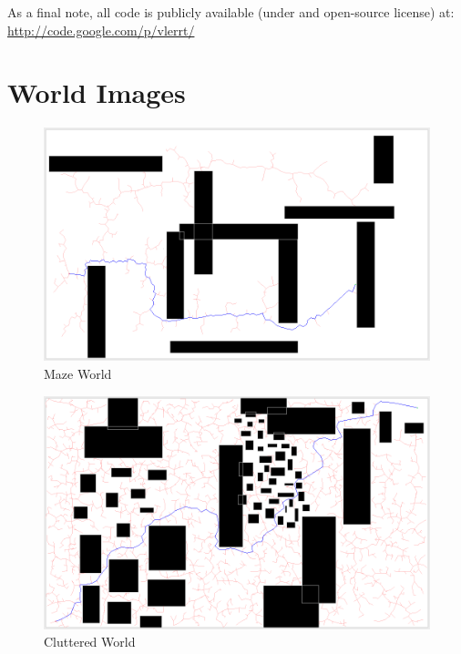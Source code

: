 \documentclass[10pt,twoside,twocolumn]{article}
\begin{document}
As a final note, all code is publicly available (under and open-source license) at:\\ 
\url{http://code.google.com/p/vlerrt/}

{}


\appendix 
\section{World Images}
\begin{figure}[h]
\begin{center}
\includegraphics[scale=0.20]{paper_world.png}
\end{center}
\caption{Maze World}
\end{figure}
\begin{figure}[h]
\begin{center}
\includegraphics[scale=0.2]{cluttered_world.png}
\end{center}
\caption{Cluttered World}
\end{figure}
\end{document}
